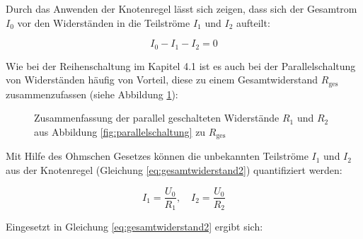 \begin{frame}
{   Durch das Anwenden der Knotenregel lässt sich zeigen, dass sich der Gesamtrom $I_0$ vor den Widerständen in die Teilströme 
   $I_1$ und $I_2$ aufteilt:




   \begin{equation}
	I_0 - I_1 - I_2 = 0
\label{eq:gesamtwiderstand2}	
\end{equation}


   Wie bei der Reihenschaltung im Kapitel 4.1 ist es auch bei der Parallelschaltung von Widerständen 
   häufig von Vorteil, diese zu einem Gesamtwiderstand $R_\mathrm{ges}$ zusammenzufassen (siehe Abbildung \ref{fig:parallelzusammen}): 

   \begin{figure}[h!]
	\begin{center}



   \end{center}
   \caption{Zusammenfassung der parallel geschalteten Widerstände $R_1$ und $R_2$ aus Abbildung \ref{fig:parallelschaltung} zu $R_\mathrm{ges}$}
   \label{fig:parallelzusammen}
   \end{figure}

   Mit Hilfe des Ohmschen Gesetzes können die unbekannten Teilströme $I_1$ und $I_2$ aus der Knotenregel (Gleichung \ref{eq:gesamtwiderstand2}) quantifiziert werden:

   \begin{equation*}
	I_1 = \frac{U_0}{R_1}, \quad I_2 = \frac{U_0}{R_2}
   \end{equation*}

   Eingesetzt in Gleichung \ref{eq:gesamtwiderstand2} ergibt sich:



}
\end{frame}
